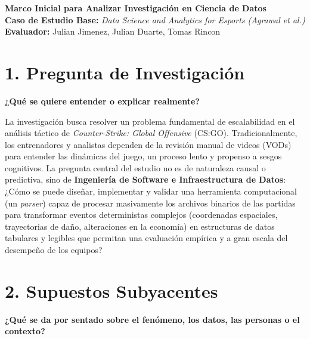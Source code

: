 \documentclass[12pt,a4paper]{article}
\begin{document}
\begin{center}
    \Large \textbf{Marco Inicial para Analizar Investigación en Ciencia de Datos} \\
    \vspace{0.3cm}
    \large \textbf{Caso de Estudio Base:} \textit{Data Science and Analytics for Esports (Agrawal et al.)} \\
    \vspace{0.5cm}
    \normalsize \textbf{Evaluador:} Julian Jimenez, Julian Duarte, Tomas Rincon
\end{center}

\vspace{0.8cm}

\section*{1. Pregunta de Investigación}
\textbf{¿Qué se quiere entender o explicar realmente?}

La investigación busca resolver un problema fundamental de escalabilidad en el análisis táctico de \textit{Counter-Strike: Global Offensive} (CS:GO). Tradicionalmente, los entrenadores y analistas dependen de la revisión manual de videos (VODs) para entender las dinámicas del juego, un proceso lento y propenso a sesgos cognitivos. La pregunta central del estudio no es de naturaleza causal o predictiva, sino de \textbf{Ingeniería de Software e Infraestructura de Datos}: ¿Cómo se puede diseñar, implementar y validar una herramienta computacional (un \textit{parser}) capaz de procesar masivamente los archivos binarios de las partidas para transformar eventos deterministas complejos (coordenadas espaciales, trayectorias de daño, alteraciones en la economía) en estructuras de datos tabulares y legibles que permitan una evaluación empírica y a gran escala del desempeño de los equipos?

\section*{2. Supuestos Subyacentes}
\textbf{¿Qué se da por sentado sobre el fenómeno, los datos, las personas o el contexto?}
\end{document}
